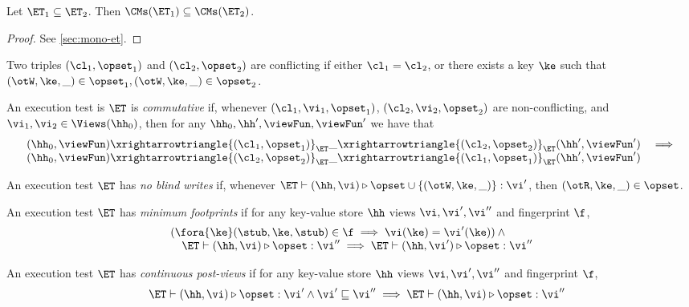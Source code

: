 \begin{proposition}
\label{prop:mono-et}
Let $\ET_1 \subseteq \ET_2$. Then $\CMs(\ET_1) \subseteq \CMs(\ET_2)$.
\end{proposition}
\begin{proof}
    \ifTechReport
    
    \else
    See \cref{sec:mono-et}.
    \fi
\end{proof}

\begin{definition}
Two triples $(\cl_1, \opset_1)$ and $(\cl_2, \opset_2)$ are 
conflicting if either $\cl_1 = \cl_2$, or there exists a key $\ke$ such that 
$(\otW, \ke, \_) \in \opset_1, (\otW, \ke, \_) \in \opset_2$. 

An execution test is $\ET$ is \emph{commutative} if, whenever $(\cl_1, \vi_1, \opset_1)$, 
$(\cl_2, \vi_2, \opset_2)$ are non-conflicting, and $\vi_1, \vi_2 \in \Views(\hh_0)$,  
then for any $\hh_0, \hh', \viewFun, \viewFun'$ we have that 
\[
\begin{array}{lr}
(\hh_0, \viewFun) \xrightarrowtriangle{(\cl_1, \opset_1)}_{\ET} 
\_ \xrightarrowtriangle{(\cl_2, \opset_2)}_{\ET} (\hh', \viewFun') &\implies \\
(\hh_0, \viewFun) \xrightarrowtriangle{(\cl_2, \opset_2)}_{\ET} 
\_ \xrightarrowtriangle{(\cl_1, \opset_1)}_{\ET} (\hh', \viewFun')
\end{array}
\]
\end{definition}

\begin{definition}
An execution test $\ET$ has \emph{no blind writes} if, whenever $\ET \vdash (\hh, \vi) \triangleright \opset \cup \{(\otW, \ke, \_)\} : \vi'$, 
then $(\otR, \ke, \_) \in \opset$.
\end{definition}

\begin{definition}
An execution test $\ET$ has \emph{minimum footprints} if for any key-value store \( \hh \)
views \( \vi, \vi',\vi''\) and fingerprint \( \f \),
\[
\begin{array}{@{}l@{}}
    ( \fora{ \ke} (\stub, \ke, \stub) \in \f \implies \vi(\ke) = \vi'(\ke) ) \land {} \\
    \quad \ET \vdash (\hh, \vi) \triangleright \opset : \vi'' \implies \ET \vdash (\hh, \vi') \triangleright \opset : \vi''
\end{array}
\]
\end{definition}

\begin{definition}
An execution test $\ET$ has \emph{continuous post-views} if for any key-value store \( \hh \)
views \( \vi, \vi',\vi''\) and fingerprint \( \f \), 
\[
\begin{array}{@{}l@{}}
    \quad \ET \vdash (\hh, \vi) \triangleright \opset : \vi' \land \vi' \sqsubseteq \vi'' \implies \ET \vdash (\hh, \vi) \triangleright \opset : \vi''
\end{array}
\]
\end{definition}

